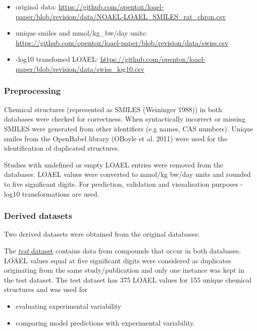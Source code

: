 \documentclass[]{achemso}
\providecommand{\tightlist}{%
  \setlength{\itemsep}{0pt}\setlength{\parskip}{0pt}}
\begin{document}
\begin{itemize}
\tightlist
\item
  original data:
  \url{https://github.com/opentox/loael-paper/blob/revision/data/NOAEL-LOAEL_SMILES_rat_chron.csv}
\item
  unique smiles and mmol/kg\_bw/day units:
  \url{https://github.com/opentox/loael-paper/blob/revision/data/swiss.csv}
\item
  -log10 transfomed LOAEL:
  \url{https://github.com/opentox/loael-paper/blob/revision/data/swiss_log10.csv}
\end{itemize}

\subsubsection{Preprocessing}\label{preprocessing}

Chemical structures (represented as SMILES (Weininger 1988)) in both
databases were checked for correctness. When syntactically incorrect or
missing SMILES were generated from other identifiers (e.g names, CAS
numbers). Unique smiles from the OpenBabel library (OBoyle et al. 2011)
were used for the identification of duplicated structures.

Studies with undefined or empty LOAEL entries were removed from the
databases. LOAEL values were converted to mmol/kg bw/day units and
rounded to five significant digits. For prediction, validation and
visualisation purposes -log10 transformations are used.

\subsubsection{Derived datasets}\label{derived-datasets}

Two derived datasets were obtained from the original databases:

The
\href{https://github.com/opentox/loael-paper/blob/revision/data/test_log10.csv}{\emph{test}
dataset} contains data from compounds that occur in both databases.
LOAEL values equal at five significant digits were considered as
duplicates originating from the same study/publication and only one
instance was kept in the test dataset. The test dataset has 375 LOAEL
values for 155 unique chemical structures and was used for

\begin{itemize}
\tightlist
\item
  evaluating experimental variability
\item
  comparing model predictions with experimental variability.
\end{itemize}
\end{document}

